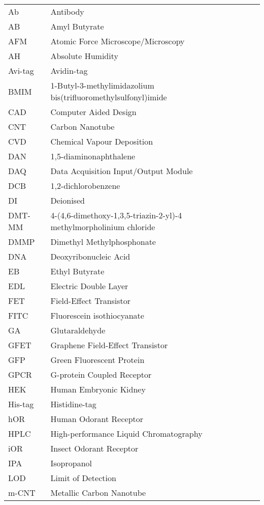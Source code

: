 \begin{table}[h]
  \begin{tabular}{@{}p{} p{}@{}}  %
    Ab  & Antibody  \\
    AB  & Amyl Butyrate  \\
    AFM  & Atomic Force Microscope/Microscopy  \\
    AH  & Absolute Humidity  \\
    Avi-tag  & Avidin-tag  \\
    BMIM  & 1-Butyl-3-methylimidazolium bis(trifluoromethylsulfonyl)imide  \\
    CAD  & Computer Aided Design \\
    CNT  & Carbon Nanotube  \\
    CVD  & Chemical Vapour Deposition  \\
    DAN  & 1,5-diaminonaphthalene  \\
    DAQ  & Data Acquisition Input/Output Module  \\
    DCB  & 1,2-dichlorobenzene  \\
    DI  & Deionised  \\
    DMT-MM   & 4-(4,6-dimethoxy-1,3,5-triazin-2-yl)-4 methylmorpholinium chloride \\
    DMMP  & Dimethyl Methylphosphonate  \\
    DNA  & Deoxyribonucleic Acid  \\
    EB  & Ethyl Butyrate  \\
    EDL  & Electric Double Layer  \\
    FET  & Field-Effect Transistor  \\
    FITC  & Fluorescein isothiocyanate  \\
    GA  & Glutaraldehyde  \\
    GFET  & Graphene Field-Effect Transistor  \\
    GFP  & Green Fluorescent Protein  \\
    GPCR  & G-protein Coupled Receptor  \\
    HEK  & Human Embryonic Kidney  \\
    His-tag  & Histidine-tag  \\
    hOR  & Human Odorant Receptor  \\
    HPLC  & High-performance Liquid Chromatography   \\
    iOR  & Insect Odorant Receptor  \\
    IPA  & Isopropanol  \\
    LOD  & Limit of Detection  \\
    m-CNT  & Metallic Carbon Nanotube   \\
  \end{tabular}
\end{table}

